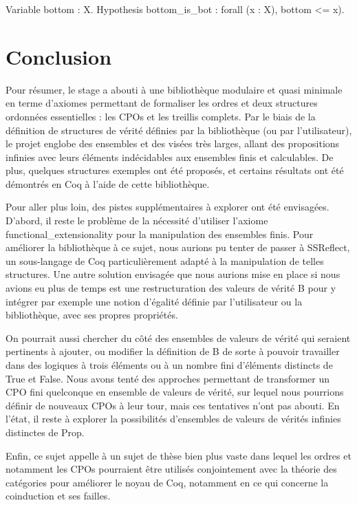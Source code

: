 \documentclass{article}
\newcommand\code[1]{{\fontfamily{lmtt}\selectfont #1}}
\theoremstyle{definition}
\begin{document}
\begin{coq}
 Variable bottom : X.
 Hypothesis bottom_is_bot : forall (x : X), bottom <= x).
\end{coq}




\section*{Conclusion}

Pour résumer, le stage a abouti à une bibliothèque modulaire et quasi minimale en terme d'axiomes permettant de formaliser les ordres et deux structures ordonnées essentielles : les CPOs et les treillis complets. Par le biais de la définition de structures de vérité définies par la bibliothèque (ou par l'utilisateur), le projet englobe des ensembles et des visées très larges, allant des propositions infinies avec leurs éléments indécidables aux ensembles finis et calculables. De plus, quelques structures exemples ont été proposés, et certains résultats ont été démontrés en Coq à l'aide de cette bibliothèque.

\medskip

Pour aller plus loin, des pistes supplémentaires à explorer ont été envisagées. D'abord, il reste le problème de la nécessité d'utiliser l'axiome \code{functional\_extensionality} pour la manipulation des ensembles finis. Pour améliorer la bibliothèque à ce sujet, nous aurions pu tenter de passer à SSReflect, un sous-langage de Coq particulièrement adapté à la manipulation de telles structures. Une autre solution envisagée que nous aurions mise en place si nous avions eu plus de temps est une restructuration des valeurs de vérité \code{B} pour y intégrer par exemple une notion d'égalité définie par l'utilisateur ou la bibliothèque, avec ses propres propriétés.

On pourrait aussi chercher du côté des ensembles de valeurs de vérité qui seraient pertinents à ajouter, ou modifier la définition de \code{B} de sorte à pouvoir travailler dans des logiques à trois éléments ou à un nombre fini d'éléments distincts de \code{True} et \code{False}. Nous avons tenté des approches permettant de transformer un CPO fini quelconque en ensemble de valeurs de vérité, sur lequel nous pourrions définir de nouveaux CPOs à leur tour, mais ces tentatives n'ont pas abouti. En l'état, il reste à explorer la possibilités d'ensembles de valeurs de vérités infinies distinctes de \code{Prop}.

Enfin, ce sujet appelle à un sujet de thèse bien plus vaste dans lequel les ordres et notamment les CPOs pourraient être utilisés conjointement avec la théorie des catégories pour améliorer le noyau de Coq, notamment en ce qui concerne la coinduction et ses failles.
\end{document}
